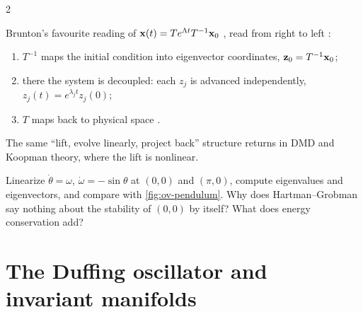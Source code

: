 \begin{paracol}{2}
\begin{intuition}
Brunton's favourite reading of $\mathbf{x}(t)=Te^{\Lambda t}T^{-1}\mathbf{x}_0$ , read from
right to left :
\begin{enumerate}
  \item $T^{-1}$ maps the initial condition into eigenvector coordinates, $\mathbf{z}_0=T^{-1}\mathbf{x}_0$;
  \item there the system is decoupled: each $z_j$ is advanced independently, $z_j(t)=e^{\lambda_jt}z_j(0)$;
  \item $T$ maps back to physical space .
\end{enumerate}
The same ``lift, evolve linearly, project back'' structure returns in DMD and Koopman theory, where the
lift is nonlinear.
\end{intuition}

\begin{exercise}
Linearize $\dot\theta=\omega$, $\dot\omega=-\sin\theta$ at $(0,0)$ and $(\pi,0)$, compute eigenvalues
and eigenvectors, and compare with \cref{fig:ov-pendulum}. Why does Hartman--Grobman say nothing about
the stability of $(0,0)$ by itself? What does energy conservation add?
\end{exercise}

\section{The Duffing oscillator and invariant manifolds}\label{sec:fu-duffing}


\end{paracol}
